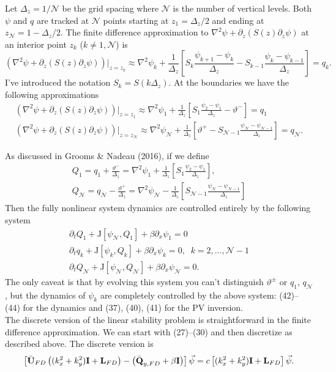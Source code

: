 \documentclass[10pt]{article}
\newcommand{\pd}[1]{\partial_{#1}}
\newcommand{\tJ}{\text{J}}
\newcommand{\sN}{\mathcal{N}}
\newcommand{\mat}[1]{\text{\bf #1}}
\begin{document}
Let $\Delta_z = 1/\sN$ be the grid spacing where $\sN$ is the number of vertical levels.
Both $\psi$ and $q$ are tracked at $\sN$ points starting at $z_1=\Delta_z/2$ and ending at $z_\sN=1-\Delta_z/2$.
The finite difference approximation to $\nabla^2\psi+\pd{z}(S(z)\pd{z}\psi)$ at an interior point $z_k$ ($k\neq1,\sN$) is
\begin{equation}
\left(\nabla^2\psi+\pd{z}(S(z)\pd{z}\psi)\right)|_{z=z_k} \approx\nabla^2\psi_k+ \frac{1}{\Delta_z}\left[S_k\frac{\psi_{k+1}-\psi_k}{\Delta_z}-S_{k-1}\frac{\psi_k-\psi_{k-1}}{\Delta_z}\right] = q_k.
\end{equation}
I've introduced the notation $S_k = S(k\Delta_z)$.
At the boundaries we have the following approximations
\begin{gather}
\left(\nabla^2\psi+\pd{z}(S(z)\pd{z}\psi)\right)|_{z=z_1} \approx \nabla^2\psi_1+\frac{1}{\Delta_z}\left[S_1\frac{\psi_{2}-\psi_1}{\Delta_z}-\vartheta^-\right] = q_1\\
\left(\nabla^2\psi+\pd{z}(S(z)\pd{z}\psi)\right)|_{z=z_\sN} \approx \nabla^2\psi_\sN+\frac{1}{\Delta_z}\left[\vartheta^+-S_{\sN-1}\frac{\psi_\sN-\psi_{\sN-1}}{\Delta_z}\right] = q_\sN.
\end{gather}

As discussed in Grooms \& Nadeau (2016), if we define
\begin{gather}
Q_1 = q_1+\frac{\vartheta^-}{\Delta_z} = \nabla^2\psi_1+\frac{1}{\Delta_z}\left[S_1\frac{\psi_{2}-\psi_1}{\Delta_z}\right],\\
Q_\sN = q_\sN-\frac{\vartheta^+}{\Delta_z} = \nabla^2\psi_\sN-\frac{1}{\Delta_z}\left[S_{\sN-1}\frac{\psi_\sN-\psi_{\sN-1}}{\Delta_z}\right]
\end{gather}
Then the fully nonlinear system dynamics are controlled entirely by the following system
\begin{gather}
\pd{t}Q_1 + \tJ[\psi_\sN,Q_1] + \beta\pd{x}\psi_1 = 0\\
\pd{t}q_k + \tJ[\psi_k,Q_k] + \beta\pd{x}\psi_k = 0,\;\;k = 2,\ldots,\sN-1\\
\pd{t}Q_\sN + \tJ[\psi_\sN,Q_\sN] + \beta\pd{x}\psi_\sN = 0.
\end{gather}
The only caveat is that by evolving this system you can't distinguish $\vartheta^\pm$ or $q_1$, $q_\sN$, but the dynamics of $\psi_k$ are completely controlled by the above system: (42)--(44) for the dynamics and (37), (40), (41) for the PV inversion.\\

The discrete version of the linear stability problem is straightforward in the finite difference approximation.
We can start with (27)--(30) and then discretize as described above.
The discrete version is
\[\left[\bar{\mat{U}}_{FD}\left((k_x^2+k_y^2)\mat{I}+\mat{L}_{FD}\right)-\left(\bar{\mat{Q}}_{y,FD}+ \beta\mat{I}\right)\right]\vec{\psi} = c\left[(k_x^2+k_y^2)\mat{I}+\mat{L}_{FD}\right]\vec{\psi}.\]
\end{document}
